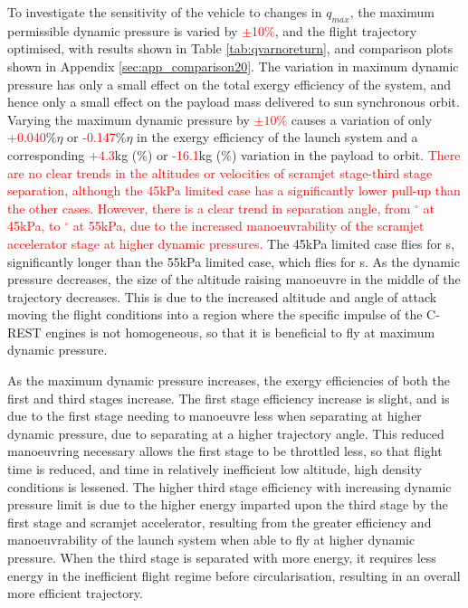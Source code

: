 To investigate the sensitivity of the vehicle to changes in $q_{max}$, the maximum permissible dynamic pressure is varied by \textcolor{red}{$\pm$10\%}, and the flight trajectory optimised, with results shown in Table \ref{tab:qvarnoreturn}, and comparison plots shown in Appendix \ref{sec:app_comparison20}.
The variation in maximum dynamic pressure has only a small effect on the total exergy efficiency of the system, and hence only a small effect on the payload mass delivered to sun synchronous orbit.  Varying the maximum dynamic pressure by \textcolor{red}{$\pm10\%$} causes a variation of only \textcolor{red}{+0.040}\%$\eta$ or \textcolor{red}{-0.147}\%$\eta$ in the exergy efficiency of the launch system and a corresponding \textcolor{red}{+4.3}kg (\PayloadVarqFiftyFiveNoReturn\%) or \textcolor{red}{-16.1}kg (\PayloadVarqFortyFiveNoReturn\%) variation in the payload to orbit.  
\textcolor{red}{There are no clear trends in the altitudes or velocities of scramjet stage-third stage separation, although the 45kPa limited case has a significantly lower pull-up than the other cases. However, there is a clear trend in separation angle, from \secondthirdSeparationgammaqFortyFiveNoReturn $^\circ$ at 45kPa, to \secondthirdSeparationgammaqFiftyFiveNoReturn $^\circ$ at 55kPa, due to the increased manoeuvrability of the scramjet accelerator stage at higher dynamic pressures. }
The 45kPa limited case flies for \secondFlightTimeqFortyFiveNoReturn s, significantly longer than the 55kPa limited case, which flies for \secondFlightTimeqFiftyFiveNoReturn s.
As the dynamic pressure decreases, the size of the altitude raising manoeuvre in the middle of the trajectory decreases. This is due to the increased altitude and angle of attack moving the flight conditions into a region where the specific impulse of the C-REST engines is not homogeneous, so that it is beneficial to fly at maximum dynamic pressure.  

As the maximum dynamic pressure increases, the exergy efficiencies of both the first and third stages increase. The first stage efficiency increase is slight, and is due to the first stage needing to manoeuvre less when separating at higher dynamic pressure, due to separating at a higher trajectory angle. This reduced manoeuvring necessary allows the first stage to be throttled less, so that flight time is reduced, and time in relatively inefficient low altitude, high density conditions is lessened. The higher third stage efficiency with increasing dynamic pressure limit is due to the higher energy imparted upon the third stage by the first stage and scramjet accelerator, resulting from the greater efficiency and manoeuvrability of the launch system when able to fly at higher dynamic pressure. When the third stage is separated with more energy, it requires less energy in the inefficient flight regime before circularisation, resulting in an overall more efficient trajectory. 



